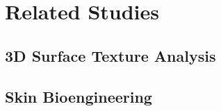 
\chapter{Related Studies} %

\label{Chapter7} %


\section{3D Surface Texture Analysis}

\section{Skin Bioengineering}

\